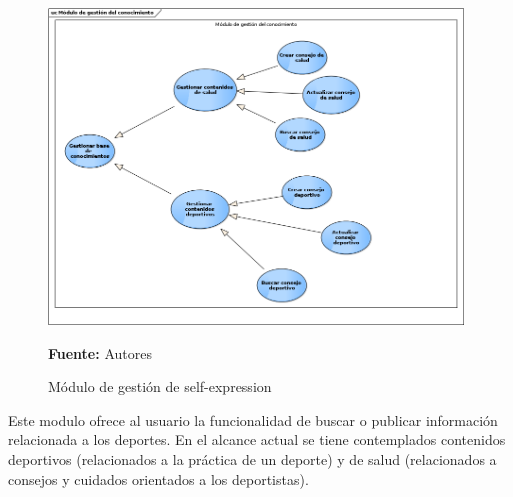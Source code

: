 \begin{figure}[!htb]
  \begin{center}
    \includegraphics[width=11cm]{./imagenes/casos_uso/gestion_conocimiento.png}
    \caption{Módulo de gestión de self-expression}
    \label{fig:cu_self_shar}
    \textbf{Fuente:} Autores \\
  \end{center}
\end{figure}

Este modulo ofrece al usuario la funcionalidad de buscar o publicar información relacionada a los deportes. En el alcance actual se tiene contemplados contenidos deportivos (relacionados a la práctica de un deporte) y de salud (relacionados a consejos y cuidados orientados a los deportistas).
